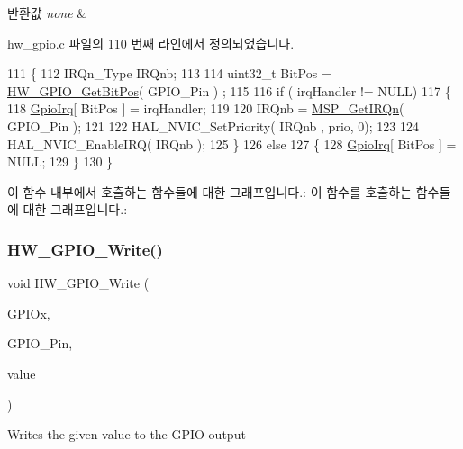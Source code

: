 \begin{DoxyRetVals}{반환값}
{\em none} & \\
\hline
\end{DoxyRetVals}


hw\+\_\+gpio.\+c 파일의 110 번째 라인에서 정의되었습니다.


\begin{DoxyCode}
111 \{
112   IRQn\_Type IRQnb;
113   
114   uint32\_t BitPos = \mbox{\hyperlink{group___lory_s_d_k___g_p_i_o___functions_ga047b5023e2411e910f43fe0ae7df38a7}{HW\_GPIO\_GetBitPos}}( GPIO\_Pin ) ;
115   
116   \textcolor{keywordflow}{if} ( irqHandler != NULL)
117   \{
118     \mbox{\hyperlink{hw__gpio_8c_a6831d3079d34f8de886dc6349615b17f}{GpioIrq}}[ BitPos ] = irqHandler;
119 
120     IRQnb = \mbox{\hyperlink{hw__gpio_8h_a76162872c9d09bf5bbdba7f98206af1a}{MSP\_GetIRQn}}( GPIO\_Pin );
121 
122     HAL\_NVIC\_SetPriority( IRQnb , prio, 0);
123     
124     HAL\_NVIC\_EnableIRQ( IRQnb );
125   \}
126   \textcolor{keywordflow}{else}
127   \{
128     \mbox{\hyperlink{hw__gpio_8c_a6831d3079d34f8de886dc6349615b17f}{GpioIrq}}[ BitPos ] = NULL;
129   \}
130 \}
\end{DoxyCode}
이 함수 내부에서 호출하는 함수들에 대한 그래프입니다.\+:
이 함수를 호출하는 함수들에 대한 그래프입니다.\+:
\mbox{\label{group___lory_s_d_k___g_p_i_o___functions_ga64b37e6d4da7e8f148c92f898aed98de}} 
\subsubsection{\texorpdfstring{H\+W\+\_\+\+G\+P\+I\+O\+\_\+\+Write()}{HW\_GPIO\_Write()}}
{\footnotesize\ttfamily void H\+W\+\_\+\+G\+P\+I\+O\+\_\+\+Write (\begin{DoxyParamCaption}\item[{G\+P\+I\+O\+\_\+\+Type\+Def $\ast$}]{G\+P\+I\+Ox,  }\item[{uint16\+\_\+t}]{G\+P\+I\+O\+\_\+\+Pin,  }\item[{uint32\+\_\+t}]{value }\end{DoxyParamCaption})}



Writes the given value to the G\+P\+IO output 


